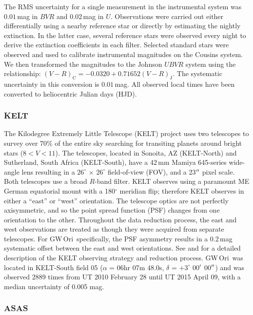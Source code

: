 \documentclass[twocolumn]{aastex61}
\newcommand{\obj}{GW\,Ori}
\begin{document}
The RMS uncertainty for a single measurement in the instrumental system was $0.01$\,mag in $BVR$ and $0.02$\,mag in $U$. Observations were carried out either differentially using a nearby reference star or directly by estimating the nightly extinction. In the latter case, several reference stars were observed every night to derive the extinction coefficients in each filter. Selected standard stars were observed and used to calibrate instrumental magnitudes on the Cousins system. We then transformed the magnitudes to the Johnson
$UBVR$ system using the relationship: $(V-R)_\mathrm{C} = -0.0320 + 0.71652(V-R)_\mathrm{J}$. The systematic uncertainty in this conversion is $0.01\,$mag. All observed local times have been converted to heliocentric Julian days (HJD).


\subsubsection{KELT}

The Kilodegree Extremely Little Telescope (KELT) project uses two telescopes to survey over 70\% of the entire sky searching for transiting planets around bright stars ($8<V<11$). The telescopes, located in Sonoita, AZ (KELT-North) and Sutherland, South Africa (KELT-South), have a 42\,mm Mamiya 645-series wide-angle lens resulting in a $26^{\circ}$ $\times$ $26^{\circ}$ field-of-view (FOV), and a 23$\mbox{$^{\prime\prime}$}$ pixel scale. Both telescopes use a broad $R$-band filter. KELT observes using a paramount ME German equatorial mount with a 180$^{\circ}$ meridian flip; therefore KELT observes in either a ``east'' or ``west'' orientation. The telescope optics are not perfectly axisymmetric, and so the point spread function (PSF) changes from one orientation to the other. Throughout the data reduction process, the east and west observations are treated as though they were acquired from separate telescopes. For \obj\ specifically, the PSF asymmetry results in a 0.2\,mag systematic offset between the east and west orientations. See \citet{Siverd12} and \citet{Kuhn16} for a detailed description of the KELT observing strategy and reduction process. \obj\ was located in KELT-South field 05 ($\alpha$ =  06hr 07m 48.0s, $\delta$ = $+3^{\circ}$ 00$\mbox{$^\prime$}$ 00$\mbox{$^{\prime\prime}$}$) and was observed 2889 times from UT 2010 February 28 until UT 2015 April 09, with a median uncertainty of 0.005 mag.


\subsubsection{ASAS}
\end{document}
